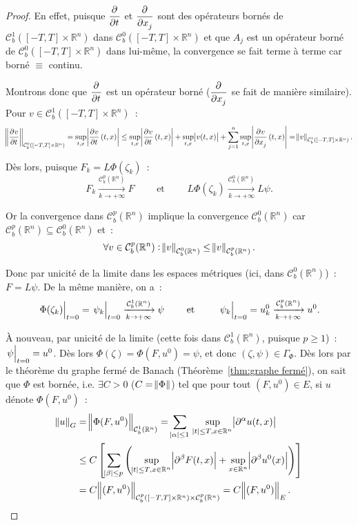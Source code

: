 \documentclass{report}
\newcommand{\R}{{\mathbb R}}
\newcommand{\pinfty}{{+\infty}}
\newcommand{\restr}[2]{\left.#1\vphantom{\big|}\right|_{#2}}
\theoremstyle{definition}
\theoremstyle{remark}
\begin{document}
\begin{proof}
En effet, puisque $\dpd {}t$ et $\dpd {}{x_j}$ sont des opérateurs bornés de $\mathcal C^1_b([-T, T] \times \R^n)$ dans $\mathcal C^0_b([-T, T] \times \R^n)$ et que $A_j$
est un opérateur borné de $\mathcal C^0_b([-T, T] \times \R^n)$ dans lui-même, la convergence se fait terme à terme car borné $\equiv$ continu.

Montrons donc que $\dpd {}t$ est un opérateur borné ($\dpd {}{x_j}$ se fait de manière similaire). Pour $v \in \mathcal C^1_b([-T, T] \times \R^n)$~:
\[\norm {\dpd vt}_{\mathcal C^0_b([-T, T] \times \R^n)} = \sup_{t,x}\abs {\dpd vt(t, x)}
\leq \sup_{t,x}\abs {\dpd vt(t, x)} + \sup_{t,x}\abs {v(t, x)} + \sum_{j=1}^n\sup_{t,x}\abs {\dpd v{x_j}(t,x)} = \norm v_{\mathcal C^1_b([-T, T] \times \R^n)}.\]

Dès lors, puisque $F_k = L\Phi(\zeta_k)$~:
\[F_k \xrightarrow[k \to \pinfty]{\mathcal C^p_b(\R^n)} F \qquad \text{ et } \qquad L\Phi(\zeta_k) \xrightarrow[k \to \pinfty]{\mathcal C^0_b(\R^n)} L\psi.\]

Or la convergence dans $\mathcal C^p_b(\R^n)$ implique la convergence $\mathcal C^0_b(\R^n)$ car $\mathcal C^p_b(\R^n) \subseteq \mathcal C^0_b(\R^n)$ et~:
\[\forall v \in \mathcal C^p_b(\R^n) : \norm v_{\mathcal C^0_b(\R^n)} \leq \norm v_{\mathcal C^p_b(\R^n)}.\]

Donc par unicité de la limite dans les espaces métriques (ici, dans $\mathcal C^0_b(\R^n)$)~: $F = L\psi$. De la même manière, on a~:
\[\restr{\Phi(\zeta_k)}{t=0} = \restr {\psi_k}{t=0} \xrightarrow[k \to \pinfty]{\mathcal C^1_b(\R^n)} \psi
\qquad \text{ et } \qquad \restr {\psi_k}{t=0} = u^0_k \xrightarrow[k \to \pinfty]{\mathcal C^p_b(\R^n)} u^0.\]

À nouveau, par unicité de la limite (cette fois dans $\mathcal C^1_b(\R^n)$, puisque $p \geq 1$)~: $\restr {\psi}{t=0} = u^0$. Dès lors $\Phi(\zeta) = \Phi(F, u^0) = \psi$, et donc
$(\zeta, \psi) \in \Gamma_\Phi$. Dès lors par le théorème du graphe fermé de Banach (Théorème~\ref{thm:graphe fermé}), on sait que $\Phi$ est bornée, i.e. $\exists C > 0$
($C = \norm \Phi$) tel que pour tout $(F, u^0) \in E$, si $u$ dénote $\Phi(F, u^0)$~:
\begin{align}\label{eq:Phi bornée}
	\norm u_G &= \norm {\Phi(F, u^0)}_{\mathcal C^1_b(\R^n)} = \sum_{\abs \alpha \leq 1}\;\sup_{\abs t \leq T,x \in \R^n}\abs {\partial^\alpha u(t, x)} \nonumber \\
		&\leq C\left[\sum_{\abs {\beta} \leq p}\left(\sup_{\abs t \leq T, x \in \R^n}\abs {\partial^\beta F(t, x)} + \sup_{x \in \R^n}\abs {\partial^\beta u^0(x)}\right)\right] \\
		&= C\norm {(F, u^0)}_{\mathcal C^p_b([-T, T] \times \R^n) \times \mathcal C^p_b(\R^n)} = C\norm {(F, u^0)}_E. \nonumber
\end{align}


\end{proof}
\end{document}
